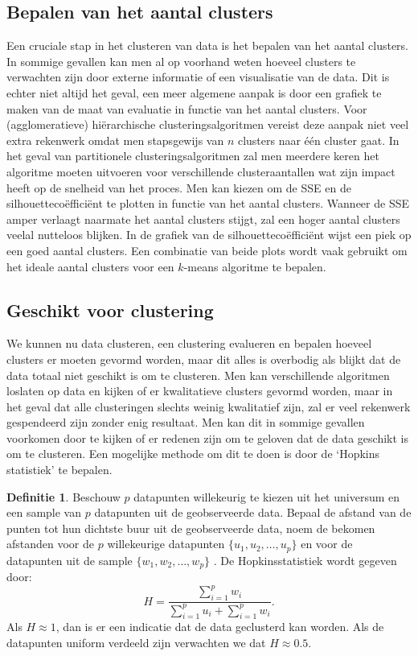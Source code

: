 \documentclass[a4paper,12pt]{article}
\theoremstyle{definition}
\newtheorem{definition}{Definitie}[subsection]
\begin{document}
\subsection{Bepalen van het aantal clusters}
Een cruciale stap in het clusteren van data is het bepalen van het aantal clusters. In sommige gevallen kan men al op voorhand weten hoeveel clusters te verwachten zijn
door externe informatie of een visualisatie van de data. Dit is echter niet altijd het geval, een meer algemene aanpak is door een grafiek te  maken van de maat van evaluatie
in functie van het aantal clusters. Voor (agglomeratieve) hiërarchische clusteringsalgoritmen vereist deze aanpak niet veel extra rekenwerk omdat men stapsgewijs van $n$ clusters
naar één cluster gaat. In het geval van partitionele clusteringsalgoritmen zal men meerdere keren het algoritme moeten uitvoeren voor verschillende clusteraantallen wat zijn impact
heeft op de snelheid van het proces. Men kan kiezen om de SSE en de silhouettecoëfficiënt te plotten in functie van het aantal clusters. Wanneer de SSE amper verlaagt naarmate het aantal clusters stijgt, zal een hoger aantal clusters veelal nutteloos blijken. In de grafiek van de silhouettecoëfficiënt wijst een piek op een goed aantal clusters. Een combinatie van beide plots
wordt vaak gebruikt om het ideale aantal clusters voor een $k$-means algoritme te bepalen.

\subsection{Geschikt voor clustering}
We kunnen nu data clusteren, een clustering evalueren en bepalen hoeveel clusters er moeten gevormd worden, maar dit alles is overbodig als blijkt dat de data totaal niet geschikt is om te clusteren. Men kan verschillende algoritmen loslaten op data en kijken of er kwalitatieve clusters gevormd worden, maar in het geval dat alle clusteringen slechts weinig kwalitatief zijn,
zal er veel rekenwerk gespendeerd zijn zonder enig resultaat. Men kan dit in sommige gevallen voorkomen door te kijken of er redenen zijn om te geloven dat de data geschikt is om te clusteren.
Een mogelijke methode om dit te doen is door de `Hopkins statistiek' te bepalen.

\newpage
\begin{definition}
Beschouw $p$ datapunten willekeurig te kiezen uit het universum en een sample van $p$ datapunten uit de geobserveerde data.
Bepaal de afstand van de punten tot hun dichtste buur uit de geobserveerde data, noem de bekomen afstanden voor de $p$ willekeurige datapunten $\{u_1, u_2, \ldots, u_p\}$  en voor
de datapunten uit de sample $\{w_1, w_2, \ldots, w_p\}$ . De Hopkinsstatistiek wordt gegeven door:
$$H = \dfrac{\sum\limits_{i=1}^pw_i}{\sum\limits_{i=1}^pu_i + \sum\limits_{i=1}^pw_i}.$$
Als $H\approx1$, dan is er een indicatie dat de data geclusterd kan worden.
Als de datapunten uniform verdeeld zijn verwachten we dat $H\approx0.5$.
\end{definition}
\end{document}
